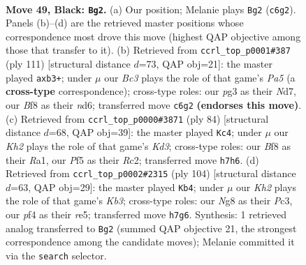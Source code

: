 \documentclass[11pt]{article}
\begin{document}
\clearpage

\begin{figure}[p]\centering
\begin{subfigure}{0.46\textwidth}\centering
\resizebox{\linewidth}{!}{%
\newchessgame
\chessboard[
  setfen={2r2bn1/p5pk/P1b5/1p3p1p/1P3P1K/1R2P1P1/8/RNB5 b - - 13 49},
  showmover=false,
  pgfstyle=straightmove, color=movearrow, markmove={c6-g2}
]}
\caption{}
\end{subfigure}\hfill
\begin{subfigure}{0.46\textwidth}\centering
\resizebox{\linewidth}{!}{%
\newchessgame
\chessboard[
  setfen={5r2/3n1p2/3Np3/2p1P1bk/pPP4p/P7/K3R1PB/8 b - b3 0 56},
  showmover=false,
  pgfstyle=straightmove, color=movearrow, markmove={a4-b3}
]}
\caption{}
\end{subfigure}
\\[4pt]
\begin{subfigure}{0.46\textwidth}\centering
\resizebox{\linewidth}{!}{%
\newchessgame
\chessboard[
  setfen={2r5/pr3p1p/2k1p1p1/p1P1P3/1b1P4/3KB3/2R3PP/R7 w - - 9 43},
  showmover=false,
  pgfstyle=straightmove, color=movearrow, markmove={d3-c4}
]}
\caption{}
\end{subfigure}\hfill
\begin{subfigure}{0.46\textwidth}\centering
\resizebox{\linewidth}{!}{%
\newchessgame
\chessboard[
  setfen={1r4b1/5p2/1p1R1Ppk/1P1pr2p/7P/1KPB1R2/8/8 w - - 18 53},
  showmover=false,
  pgfstyle=straightmove, color=movearrow, markmove={b3-b4}
]}
\caption{}
\end{subfigure}
\caption{\textbf{Move 49, Black: \texttt{Bg2}.} (a) Our position; Melanie plays \texttt{Bg2} (\texttt{c6g2}). Panels (b)--(d) are the retrieved master positions whose correspondence most drove this move (highest QAP objective among those that transfer to it). (b) Retrieved from \texttt{ccrl\_top\_p0001\#387} (ply 111) [structural distance $d$=73, QAP obj=21]: the master played \texttt{axb3+}; under $\mu$ our \emph{Bc3} plays the role of that game's \emph{Pa5} (a \textbf{cross-type} correspondence); cross-type roles: our \emph{p}g3 as their \emph{N}d7, our \emph{B}f8 as their \emph{n}d6; transferred move \texttt{c6g2} \textbf{(endorses this move)}. (c) Retrieved from \texttt{ccrl\_top\_p0000\#3871} (ply 84) [structural distance $d$=68, QAP obj=39]: the master played \texttt{Kc4}; under $\mu$ our \emph{Kh2} plays the role of that game's \emph{Kd3}; cross-type roles: our \emph{B}f8 as their \emph{R}a1, our \emph{P}f5 as their \emph{R}c2; transferred move \texttt{h7h6}. (d) Retrieved from \texttt{ccrl\_top\_p0002\#2315} (ply 104) [structural distance $d$=63, QAP obj=29]: the master played \texttt{Kb4}; under $\mu$ our \emph{Kh2} plays the role of that game's \emph{Kb3}; cross-type roles: our \emph{N}g8 as their \emph{P}c3, our \emph{p}f4 as their \emph{r}e5; transferred move \texttt{h7g6}. Synthesis: 1 retrieved analog transferred to \texttt{Bg2} (summed QAP objective 21, the strongest correspondence among the candidate moves); Melanie committed it via the \texttt{search} selector.}
\label{fig:thought-m97}
\end{figure}
\end{document}
